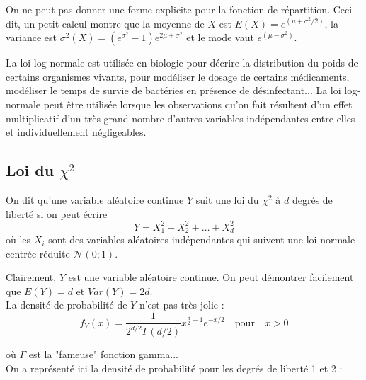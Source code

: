 \documentclass[12pt, a4paper]{book}
\numberwithin{equation}{section}
\begin{document}
On ne peut pas donner une forme explicite pour la fonction de répartition. Ceci dit,  un petit calcul montre que la 
moyenne de $X$ est  $E(X)=e^{(\mu+\sigma^2/2)}$,  la variance  est $\sigma^2(X)=(e^{\sigma^2}-1) e^{2\mu+\sigma^2}$ et le mode vaut $e^{(\mu-\sigma^2)}$.

La loi log-normale est utilisée en biologie pour décrire la distribution du  poids   de certains organismes vivants,
pour modéliser le dosage de certains médicaments, modéliser le temps de survie de bactéries en présence de désinfectant...
La loi log-normale peut être utilisée lorsque les observations qu'on fait résultent d'un effet multiplicatif 
d'un très grand nombre d'autres variables indépendantes entre elles et individuellement négligeables.


\subsection[Loi du chi-2]{Loi du $\chi^2$}

On dit qu'une variable aléatoire continue $Y$ suit une loi du $\chi^2$ à $d$ degrés de liberté si on peut écrire
$$
Y=X_1^2 + X_2^2 + \hdots + X_d^2
$$
où les $X_i$ sont des variables aléatoires indépendantes qui suivent une loi normale centrée réduite $\mathcal{N}(0;1)$.

Clairement, $Y$ est une variable aléatoire continue. On peut démontrer facilement que $E(Y)=d$ et $Var(Y)=2d$.\\

\noindent La densité de probabilité de $Y$ n'est pas très jolie :
$$
f_Y(x)=\frac{1}{2^{d/2} \Gamma(d/2)} x^{\frac{d}{2}-1} e^{-x/2}\quad \mathrm{pour} \quad x>0
$$

\noindent où $\Gamma$ est la  "fameuse" fonction gamma...\\

\noindent On a représenté ici la densité de probabilité pour les degrés de liberté 1 et 2 :
\begin{center}
\end{center}
\end{document}
